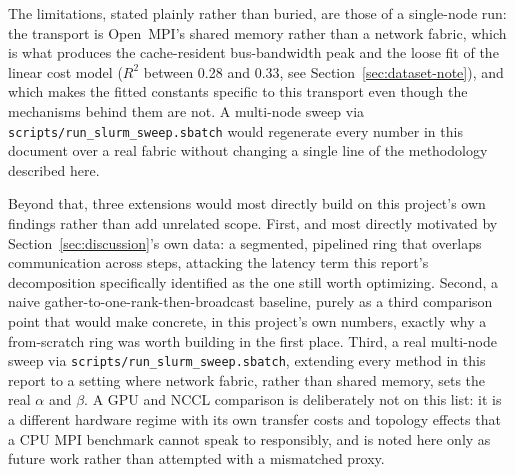 The limitations, stated plainly rather than buried, are those of a single-node run: the transport is Open~MPI's shared memory rather than a network fabric, which is what produces the cache-resident bus-bandwidth peak and the loose fit of the linear cost model ($R^2$ between 0.28 and 0.33, see Section~\ref{sec:dataset-note}), and which makes the fitted constants specific to this transport even though the mechanisms behind them are not. A multi-node sweep via \texttt{scripts/run\_slurm\_sweep.sbatch} would regenerate every number in this document over a real fabric without changing a single line of the methodology described here.

Beyond that, three extensions would most directly build on this project's own findings rather than add unrelated scope. First, and most directly motivated by Section~\ref{sec:discussion}'s own data: a segmented, pipelined ring that overlaps communication across steps, attacking the latency term this report's decomposition specifically identified as the one still worth optimizing. Second, a naive gather-to-one-rank-then-broadcast baseline, purely as a third comparison point that would make concrete, in this project's own numbers, exactly why a from-scratch ring was worth building in the first place. Third, a real multi-node sweep via \texttt{scripts/run\_slurm\_sweep.sbatch}, extending every method in this report to a setting where network fabric, rather than shared memory, sets the real $\alpha$ and $\beta$. A GPU and NCCL comparison is deliberately not on this list: it is a different hardware regime with its own transfer costs and topology effects that a CPU MPI benchmark cannot speak to responsibly, and is noted here only as future work rather than attempted with a mismatched proxy.
